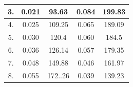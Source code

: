 \documentclass[a4paper,12pt]{article}
\begin{document}
\begin{table}[H]
{\begin{tabular}{|c|cc|cc|}
		3.                                    & \multicolumn{1}{c|}{0.021}                                                                               & 93.63                                                                        & \multicolumn{1}{c|}{0.084}                                                                       & 199.83                                                                       \\ \hline
		4.                                    & \multicolumn{1}{c|}{0.025}                                                                               & 109.25                                                                       & \multicolumn{1}{c|}{0.065}                                                                       & 189.09                                                                       \\ \hline
		5.                                    & \multicolumn{1}{c|}{0.030}                                                                               & 120.4                                                                        & \multicolumn{1}{c|}{0.060}                                                                       & 184.5                                                                        \\ \hline
		6.                                    & \multicolumn{1}{c|}{0.036}                                                                               & 126.14                                                                       & \multicolumn{1}{c|}{0.057}                                                                       & 179.35                                                                       \\ \hline
		7.                                    & \multicolumn{1}{c|}{0.048}                                                                               & 149.88                                                                       & \multicolumn{1}{c|}{0.046}                                                                       & 161.97                                                                       \\ \hline
		8.                                    & \multicolumn{1}{c|}{0.055}                                                                               & 172..26                                                                      & \multicolumn{1}{c|}{0.039}                                                                       & 139.23                                                                       \\ \hline

\end{tabular}}
\end{table}
\end{document}
